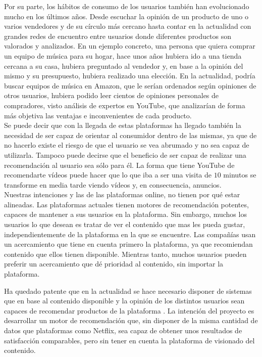 Por su parte, los hábitos de consumo de los usuarios también han evolucionado mucho en los últimos años. Desde escuchar la opinión de un producto de uno o varios vendedores y de su círculo más cercano hasta contar en la actualidad con grandes redes de encuentro entre usuarios donde diferentes productos son valorados y analizados. En un ejemplo concreto, una persona que quiera comprar un equipo de música para su hogar, hace unos años hubiera ido a una tienda cercana a su casa, hubiera preguntado al vendedor y, en base a la opinión del mismo y su presupuesto, hubiera realizado una elección. En la actualidad, podría buscar equipos de música en Amazon, que le serían ordenados según opiniones de otros usuarios, hubiera podido leer cientos de opiniones personales de compradores, visto análisis de expertos en YouTube, que analizarían de forma más objetiva las ventajas e inconvenientes de cada producto.\\

Se puede decir que con la llegada de estas plataformas ha llegado también la necesidad de ser capaz de orientar al consumidor dentro de las mismas, ya que de no hacerlo existe el riesgo de que el usuario se vea abrumado y no sea capaz de utilizarla. Tampoco puede decirse que el beneficio de ser capaz de realizar una recomendación al usuario sea sólo para él. La forma que tiene YouTube de recomendarte vídeos puede hacer que lo que iba a ser una visita de $10$ minutos se transforme en media tarde viendo vídeos y, en consecuencia, anuncios.\\

Nuestras intenciones y las de las plataformas online, no tienen por qué estar alineadas. Las plataformas actuales tienen motores de recomendación potentes, capaces de mantener a sus usuarios en la plataforma. Sin embargo, muchos los usuarios lo que desean es tratar de ver el contenido que mas les pueda gustar, independientemente de la plataforma en la que se encuentre. Las compañías usan un acercamiento que tiene en cuenta primero la plataforma, ya que recomiendan contenido que ellos tienen disponible. Mientras tanto, muchos usuarios pueden preferir un acercamiento que dé prioridad al contenido, sin importar la plataforma.

Ha quedado patente que en la actualidad se hace necesario disponer de sistemas que en base al contenido disponible y la opinión de los distintos usuarios sean capaces de recomendar productos de la plataforma \cite{Konstan2004}. La intención del proyecto es desarrollar un motor de recomendación que, sin disponer de la misma cantidad de datos que plataformas como Netflix, sea capaz de obtener unos resultados de satisfacción comparables, pero sin tener en cuenta la plataforma de visionado del contenido.


